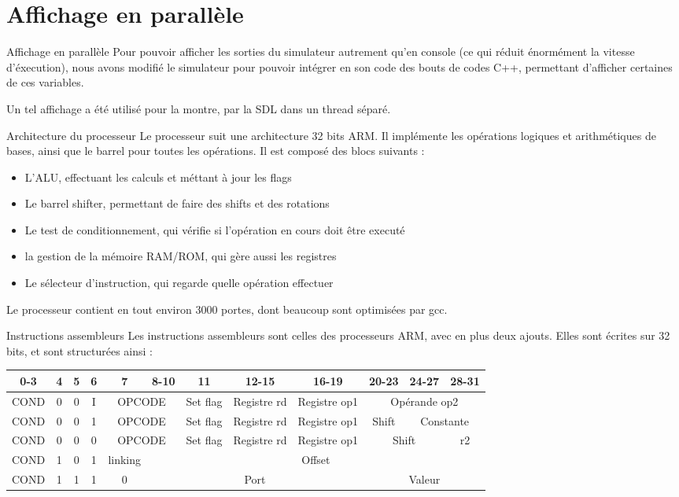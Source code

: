 \documentclass[11pt]{beamer}
\begin{document}
\section{Affichage en parallèle}

\begin{frame}{Affichage en parallèle}
  Pour pouvoir afficher les sorties du simulateur autrement qu'en console (ce
  qui réduit énormément la vitesse d'éxecution), nous avons modifié le
  simulateur pour pouvoir intégrer en son code des bouts de codes C++,
  permettant d'afficher certaines de ces variables.
  
  Un tel affichage a été utilisé pour la montre, par la SDL dans un thread séparé.
\end{frame}

\begin{frame}{Architecture du processeur}
  Le processeur suit une architecture 32 bits ARM. Il implémente les opérations
  logiques et arithmétiques de bases, ainsi que le barrel pour toutes les
  opérations.
  Il est composé des blocs suivants :
  \begin{itemize}
  \item{L'ALU, effectuant les calculs et méttant à jour les flags}
  \item{Le barrel shifter, permettant de faire des shifts et des rotations}
  \item{Le test de conditionnement, qui vérifie si l'opération en cours doit
      être executé}
  \item{la gestion de la mémoire RAM/ROM, qui gère aussi les registres}
  \item{Le sélecteur d'instruction, qui regarde quelle opération effectuer}
  \end{itemize}
  Le processeur contient en tout environ 3000 portes, dont beaucoup sont
  optimisées par gcc.
\end{frame}


\begin{frame}{Instructions assembleurs}
  Les instructions assembleurs sont celles des processeurs ARM, avec en plus
  deux ajouts. Elles sont écrites sur 32 bits, et sont structurées ainsi :
  {\tiny
  \begin{tabular}{|c|c|c|c|c|c|c|c|c|c|c|c|}
  \hline
  0-3  & 4 & 5 & 6 & 7 & 8-10 & 11 & 12-15 & 16-19 & 20-23 & 24-27 & 28-31 \\
  \hline
  COND & 0 & 0 & I & \multicolumn{2}{c|}{OPCODE} & Set flag & Registre rd & Registre op1 & \multicolumn{3}{c|}{Opérande op2}  \\
  \hline
  COND & 0 & 0 & 1 & \multicolumn{2}{c|}{OPCODE} & Set flag & Registre rd &Registre op1 & Shift & \multicolumn{2}{c|}{Constante} \\
  \hline
  COND & 0 & 0 & 0 & \multicolumn{2}{c|}{OPCODE} & Set flag & Registre rd & Registre op1 & \multicolumn{2}{c|}{Shift} & r2  \\
  \hline
  COND & 1 & 0 & 1 & linking & \multicolumn{ 7}{c|}{Offset} \\
  \hline
  COND & 1 & 1 & 1 & 0 & \multicolumn{4}{c|}{Port} & \multicolumn{3}{c|}{Valeur} \\
  \hline
\end{tabular}}
\end{frame}
\end{document}
